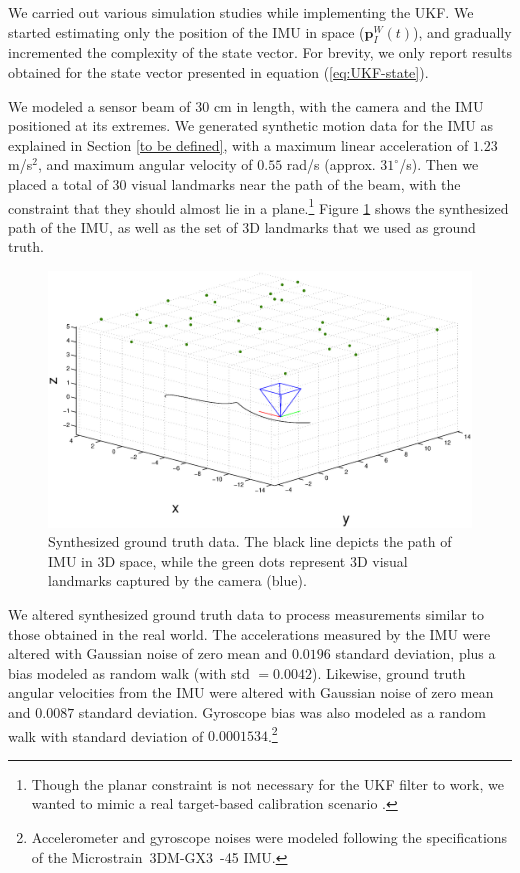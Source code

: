 \documentclass[letterpaper]{article}
\newcommand{\bb}[1]{\mathbf{#1}}
\begin{document}

We carried out various simulation studies while implementing the
UKF. We started estimating only the position of the IMU in space
($\bb{p}_I^W(t)$), and gradually incremented the complexity of the
state vector. For brevity, we only report results obtained for the
state vector presented in equation (\ref{eq:UKF-state}).

We modeled a sensor beam of $30$ cm in length, with the camera and the
IMU positioned at its extremes. We generated synthetic motion data for
the IMU as explained in Section \ref{to be defined}, with a maximum
linear acceleration of $1.23$ m/s$^2$, and maximum angular velocity of
$0.55$ rad/s (approx. $31^\circ$/s).  Then we placed a total of 30
visual landmarks near the path of the beam, with the constraint that
they should almost lie in a plane.\footnote{Though the planar
  constraint is not necessary for the UKF filter to work, we wanted to
  mimic a real target-based calibration scenario
  \cite{2011:kelly:article}.}  Figure \ref{fig:groundtruth} shows the
synthesized path of the IMU, as well as the set of 3D landmarks that
we used as ground truth.

\begin{figure}[h!p]
\centering
\includegraphics[width=.7\linewidth]{groundTruth.eps}
\vspace{-1em}
\caption{Synthesized ground truth data. The black line depicts the
  path of IMU in 3D space, while the green dots represent 3D visual
  landmarks captured by the camera (blue).}
\label{fig:groundtruth}
\end{figure}

We altered synthesized ground truth data to process measurements
similar to those obtained in the real world. The accelerations
measured by the IMU were altered with Gaussian noise of zero mean and
$0.0196$ standard deviation, plus a bias modeled as random walk (with
std $= 0.0042$). Likewise, ground truth angular velocities from the
IMU were altered with Gaussian noise of zero mean and $0.0087$
standard deviation. Gyroscope bias was also modeled as a random walk
with standard deviation of $0.0001534$.\footnote{Accelerometer and
  gyroscope noises were modeled following the specifications of the
  Microstrain\textregistered\ 3DM-GX3\textregistered\ -45 IMU.}
\end{document}
